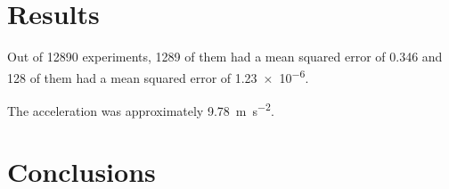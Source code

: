 \documentclass[oneside,12pt]{scrbook}
\theoremstyle{break}
\begin{document}
\chapter{Results}
\label{ch:results}

Out of \num{12890} experiments, \num{1289} of them had a mean
squared error of \num{.346} and \num{128} of them had a mean
squared error of \num{1.23e-6}.

The acceleration was approximately
\SI{9.78}{\metre\per\square\second}.


\chapter{Conclusions}
\label{ch:conc}


\backmatter

\printterms[database=glossary]
\printterms[database=acronym]
\printterms[database=notation]

\printbibliography

\printterms[database=index]
\end{document}
